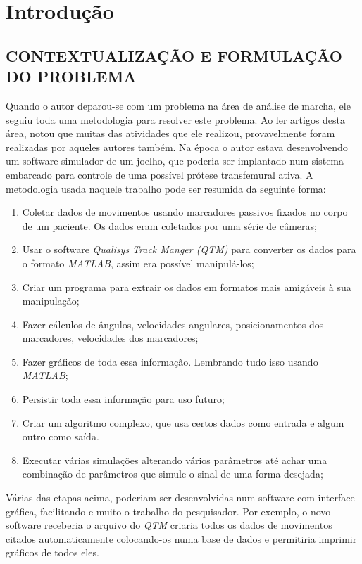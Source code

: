 \chapter[INTRODUÇÃO]{\textbf {Introdução}}
\section{CONTEXTUALIZAÇÃO E FORMULAÇÃO DO PROBLEMA}
Quando o autor deparou-se com um problema na área de análise de marcha, 
ele seguiu toda uma metodologia para resolver este problema. 
Ao ler artigos desta área, notou que muitas das atividades que ele realizou, provavelmente foram realizadas por aqueles autores também. 
Na época o autor estava desenvolvendo um software simulador de um joelho, que poderia ser implantado num sistema embarcado para controle de uma possível prótese transfemural ativa.
A metodologia usada naquele trabalho pode ser resumida da seguinte forma:
\begin{enumerate}
	\item Coletar dados de movimentos usando marcadores passivos fixados no corpo de um paciente. Os dados eram coletados por uma série de câmeras;
	\item Usar o software \emph{Qualisys Track Manger (QTM)} \cite{Qualisys2010} para converter os dados para o formato \emph{MATLAB}, assim era possível manipulá-los;
	\item Criar um programa para extrair os dados em formatos mais amigáveis à sua manipulação;
	\item Fazer cálculos de ângulos, velocidades angulares, posicionamentos dos marcadores, velocidades dos marcadores;
	\item Fazer gráficos de toda essa informação. Lembrando tudo isso usando \emph{MATLAB};
	\item Persistir toda essa informação para uso futuro;
	\item Criar um algoritmo complexo, que usa certos dados como entrada e algum outro como saída.
	\item Executar várias simulações alterando vários parâmetros até achar uma combinação de parâmetros que simule o sinal de uma forma desejada;
\end{enumerate}

Várias das etapas acima, poderiam ser desenvolvidas num software com interface gráfica, facilitando e muito o trabalho do pesquisador. Por exemplo, o novo software receberia o arquivo do \emph{QTM} criaria todos os dados de movimentos citados automaticamente colocando-os numa base de dados e permitiria imprimir gráficos de todos eles.

